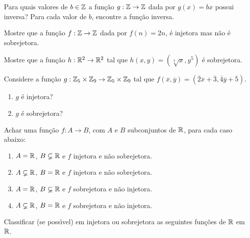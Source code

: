 \documentclass[12pt]{exam}
\begin{document}
    \vspace{.3cm}

    \questao{} Para quais valores de $b \in \mathbb{Z}$ a função $g : \mathbb{Z} \to \mathbb{Z}$ dada por $g(x) = bx$ possui inversa? Para cada valor de $b$, encontre a função inversa.

    \vspace{.3cm}

    \questao{} Mostre que a fun\c{c}\~ao $f : \mathbb{Z} \to \mathbb{Z}$ dada por $f(n) = 2n$, \'e injetora mas n\~ao \'e sobrejetora.

    \vspace{.3cm}

    \questao{} Mostre que a fun\c{c}\~ao $h : \mathbb{R}^2 \to \mathbb{R}^2$ tal que $h(x, y) = (\sqrt[3]{x}, y^5)$ \'e sobrejetora.
    \vspace{.3cm}

    \questao{} Considere a fun{\c c}{\~a}o $g : \mathbb{Z}_5 \times \mathbb{Z}_9 \to \mathbb{Z}_5 \times \mathbb{Z}_9$ tal que $f(\overline{x},\overline{y}) = (\overline{2} \overline{x} + \overline{3}, \overline{4}\overline{y} + \overline{5})$.
    \begin{enumerate}[label={\alph*})]
        \item $g$ \'e injetora?
        \item $g$ \'e sobrejetora?
    \end{enumerate}

    \vspace{.3cm}

    \questao{} Achar uma fun{\c c}{\~a}o $f : A \to B$, com $A$ e $B$ subconjuntos de $\mathbb{R}$, para cada caso abaixo:
    \begin{enumerate}[label={\alph*})]
        \item $A = \mathbb{R}$, $B \varsubsetneq \mathbb{R}$ e $f$ injetora e n{\~a}o sobrejetora.
        \item $A \varsubsetneq \mathbb{R}$, $B = \mathbb{R}$ e $f$ injetora e n{\~a}o sobrejetora.
        \item $A = \mathbb{R}$, $B \varsubsetneq \mathbb{R}$ e $f$ sobrejetora e n{\~a}o injetora.
        \item $A \varsubsetneq \mathbb{R}$, $B = \mathbb{R}$ e $f$ sobrejetora e n{\~a}o injetora.
    \end{enumerate}

    \newpage

    \questao{} Classificar (se poss{\'\i}vel) em injetora ou sobrejetora as seguintes fun{\c c}{\~o}es de $\mathbb{R}$ em $\mathbb{R}$.
\end{document}
